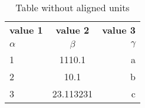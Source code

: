 \documentclass{article}
\begin{document}
	\begin{table}[h!]
		\begin{center}
			\caption{Table without aligned units}
			\label{tab:table1}
			\begin{tabular}{|l|c|r|}
				\textbf{value 1} & \textbf{value 2} & \textbf{value 3}\\
				$\alpha$ & $\beta$ & $\gamma$\\
				\hline
				1 & 1110.1 & a\\
				2 & 10.1 & b\\
				3 & 23.113231 & c\\
			\end{tabular}
		\end{center}
	\end{table}
\end{document}
